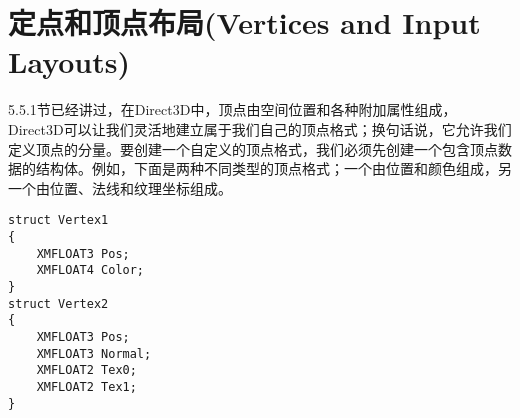 \section{定点和顶点布局(Vertices and Input Layouts)}
\begin{flushleft}
5.5.1节已经讲过，在Direct3D中，顶点由空间位置和各种附加属性组成，Direct3D可以让我们灵活地建立属于我们自己的顶点格式；换句话说，它允许我们定义顶点的分量。要创建一个自定义的顶点格式，我们必须先创建一个包含顶点数据的结构体。例如，下面是两种不同类型的顶点格式；一个由位置和颜色组成，另一个由位置、法线和纹理坐标组成。
\end{flushleft}
\begin{lstlisting}
struct Vertex1
{
    XMFLOAT3 Pos;
    XMFLOAT4 Color;
}
struct Vertex2
{
    XMFLOAT3 Pos;
    XMFLOAT3 Normal;
    XMFLOAT2 Tex0;
    XMFLOAT2 Tex1;
}
\end{lstlisting}
